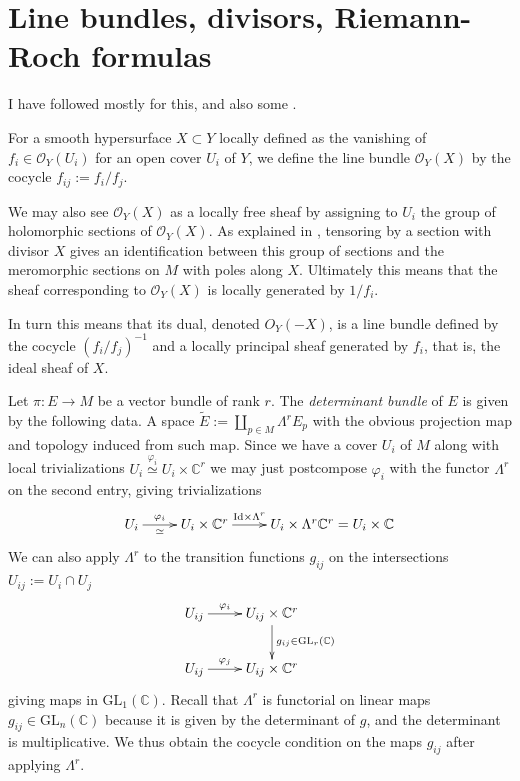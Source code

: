 \section{Line bundles, divisors, Riemann-Roch formulas}
\label{section-line-bundles}

\noindent
I have followed mostly \cite{GH} for this, and also
some \cite{lec}.

For a smooth hypersurface $X \subset Y$
locally defined as the vanishing of $f_i \in \mathcal{O}_Y(U_i)$
for an open cover $U_i$ of $Y$,
we define the line bundle $\mathcal{O}_Y(X)$
by the cocycle $f_{ij}:=f_i/f_j$.

We may also see $\mathcal{O}_Y(X)$ as a locally free sheaf
by assigning to $U_i$ the group of holomorphic sections of $\mathcal{O}_Y(X)$.
As explained in  \cite[p. 138]{GH},
tensoring by a section with divisor $X$
gives an identification between this group of
sections and the meromorphic sections on $M$ 
with poles along $X$.
Ultimately this means that the sheaf
corresponding to $\mathcal{O}_Y(X)$ is locally
generated by $1/f_i$.

In turn this means that its dual, denoted $O_Y(-X)$,
is a line bundle defined by the cocycle $(f_i/f_j)^{-1}$
and a locally principal sheaf generated by $f_i$,
that is, the ideal sheaf of $X$.

\medskip\noindent


\begin{example}
\label{example-determinant-bundle}
Let $\pi:E \to M$ be a vector bundle of rank $r$.
The {\it determinant bundle} of $E$ is given
by the following data.
A space $\tilde{E}:=\coprod_{p \in M}\Lambda^rE_p$
with the obvious projection map
and topology induced from such map.
Since we have a cover $U_i$ of $M$ 
along with local trivializations 
$U_i\overset{\varphi_i}{\simeq}U_i\times\mathbb{C}^r$ 
we may just postcompose $\varphi_i$ with the functor $\Lambda^r$ 
on the second entry, giving trivializations
$$
\xymatrix{
U_i\ar[r]^-{\varphi_i}_-{\simeq}
& U_i \times \mathbb{C}^r\ar[r]^-{\text{Id}\times \Lambda^r}
& U_i \times \Lambda^r\mathbb{C}^r=U_i \times \mathbb{C}
}
$$
We can also apply $\Lambda^r$ to the transition functions
$g_{ij}$ on the intersections $U_{ij}:=U_i\cap U_j$
$$
\xymatrix{
U_{ij}\ar[r]^-{\varphi_i}&U_{ij} \times \mathbb{C}^r
\ar[d]^{g_{ij}\in\text{GL}_r(\mathbb{C})}\\
U_{ij}\ar[r]^-{\varphi_j}&U_{ij}\times\mathbb{C}^r
}
$$
giving maps in $\text{GL}_1(\mathbb{C})$.
Recall that $\Lambda^r$ is functorial on linear maps
$g_{ij}\in \text{GL}_n(\mathbb{C})$ because
it is given by the determinant of $g$,
and the determinant is multiplicative.
We thus obtain the cocycle condition on the maps $g_{ij}$ 
after applying $\Lambda^r$.
\end{example}

